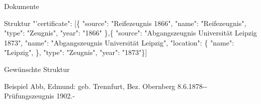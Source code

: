 \documentclass[12pt]{beamer}
\begin{document}
\begin{large}
\begin{frame}{Dokumente}
 \begin{block}{Struktur}
  \normalsize
  \hspace*{0.5cm} 
  "'certificate"{}: [\{
\newline 
\hspace*{1cm}"{}source"{}: "{}Reifezeugnis 1866"{},
\newline 
\hspace*{1cm}"{}name"{}: "{}Reifezeugnis"{},
\newline 
\hspace*{1cm}"{}type"{}: "{}Zeugnis"{},
\newline 
\hspace*{1cm}"{}year"{}: "{}1866"{}
\newline 
\hspace*{0.5cm}\},\{
\newline 
\hspace*{1cm}"{}source"{}: "{}Abgangszeugnis Universität Leipzig 1873"{},
\newline 
\hspace*{1cm}"{}name"{}: "{}Abgangszeugnis Universität Leipzig"{},
\newline 
\hspace*{1cm}"{}location"{}: \{
\newline 
\hspace*{1cm}\hspace*{0.5cm}"{}name"{}: "{}Leipzig"{},
\newline 
\hspace*{1cm}\},
\newline 
\hspace*{1cm}"{}type"{}: "{}Zeugnis"{},
\newline 
\hspace*{1cm}"{}year"{}: "{}1873"{}\}]
 \end{block} 
\end{frame}


\begin{frame}{Gewünschte Struktur}
 \begin{block}{Beispiel}
  \small
  Abb, Edmund: geb. Trennfurt, Bez. Obernberg 8.6.1878-{}- Prüfungszeugnis 1902.-
 \end{block}
\end{frame}


\end{large}
\end{document}
